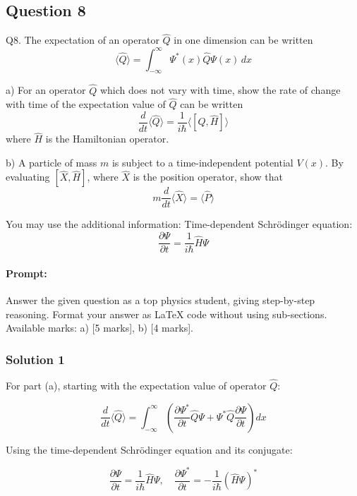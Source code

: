 \documentclass{article}
\begin{document}


\subsection{Question 8}
Q8.  
The expectation of an operator $\hat{Q}$ in one dimension can be written  
\[
\langle \hat{Q} \rangle = \int_{-\infty}^{\infty} \Psi^*(x) \hat{Q} \Psi(x) \, dx
\]

a) For an operator $\hat{Q}$ which does not vary with time, show the rate of change with time of the expectation value of $\hat{Q}$ can be written  
\[
\frac{d}{dt} \langle \hat{Q} \rangle = \frac{1}{i\hbar} \langle [\hat{Q}, \hat{H}] \rangle
\]  
where $\hat{H}$ is the Hamiltonian operator.

b) A particle of mass $m$ is subject to a time-independent potential $V(x)$. By evaluating $[\hat{X}, \hat{H}]$, where $\hat{X}$ is the position operator, show that  
\[
m \frac{d}{dt} \langle \hat{X} \rangle = \langle \hat{P} \rangle
\]

You may use the additional information:  
Time-dependent Schrödinger equation:  
\[
\frac{\partial \Psi}{\partial t} = \frac{1}{i\hbar} \hat{H} \Psi
\]


\paragraph{Prompt: \\} 
Answer the given question as a top physics student, giving step-by-step reasoning. Format your answer as LaTeX code without using sub-sections. Available marks: a) [5 marks], b) [4 marks].


\subsubsection{Solution 1}
For part (a), starting with the expectation value of operator $\hat{Q}$:

\[
\frac{d}{dt} \langle \hat{Q} \rangle = \int_{-\infty}^\infty \left( \frac{\partial \Psi^*}{\partial t} \hat{Q} \Psi + \Psi^* \hat{Q} \frac{\partial \Psi}{\partial t} \right) dx
\]

Using the time-dependent Schrödinger equation and its conjugate:

\[
\frac{\partial \Psi}{\partial t} = \frac{1}{i\hbar} \hat{H} \Psi, \quad \frac{\partial \Psi^*}{\partial t} = -\frac{1}{i\hbar} (\hat{H} \Psi)^*
\]
\end{document}
